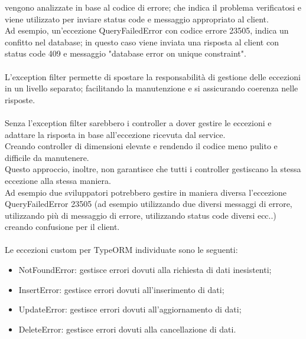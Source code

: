 vengono analizzate in base al codice di errore; che indica il problema verificatosi e viene utilizzato 
per inviare status code e messaggio appropriato al client.
\\
Ad esempio, un'eccezione QueryFailedError con codice errore 23505, indica un confitto nel database; in questo caso viene
inviata una risposta al client con status code 409 e messaggio "database error on unique constraint".
\\\\
L'exception filter permette di spostare la responsabilità di gestione delle eccezioni in un livello
separato; facilitando la manutenzione e si assicurando coerenza nelle risposte.
\\\\
Senza l'exception filter sarebbero i controller a dover gestire le eccezioni e adattare la risposta
in base all'eccezione ricevuta dal service.
\\
Creando controller di dimensioni elevate e rendendo il codice meno pulito e difficile
da manutenere. 
\\
Questo approccio, inoltre, non garantisce che tutti i controller gestiscano la stessa eccezione
alla stessa maniera. 
\\
Ad esempio due sviluppatori potrebbero gestire in maniera diversa l'eccezione QueryFailedError 23505 (ad esempio utilizzando
due diversi messaggi di errore,
utilizzando più di messaggio di errore, utilizzando status code diversi ecc..)
creando confusione per il client.
\\\\
Le eccezioni custom per TypeORM individuate sono le seguenti:
\begin{itemize}
    \item NotFoundError: gestisce errori dovuti alla richiesta di dati inesistenti;
    \item InsertError: gestisce errori dovuti all'inserimento di dati;
    \item UpdateError: gestisce errori dovuti all'aggiornamento di dati;
    \item DeleteError: gestisce errori dovuti alla cancellazione di dati.
\end{itemize}
\leavevmode\newline

